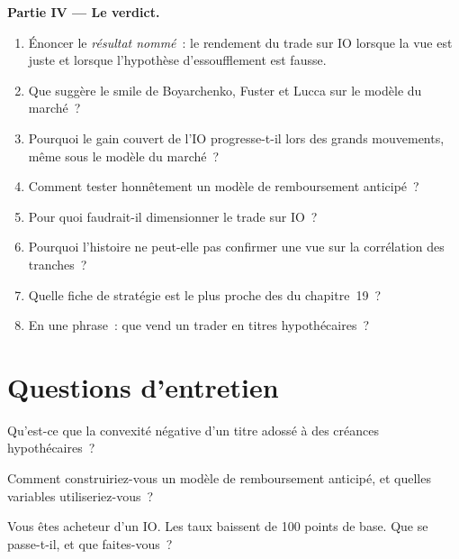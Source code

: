\begin{problem}
\medskip\noindent\textbf{Partie IV --- Le verdict.}
\begin{enumerate}[resume]
\item Énoncer le \emph{résultat nommé}~: le rendement du trade sur IO lorsque la vue est juste et lorsque l'hypothèse d'essoufflement est fausse.
\item Que suggère le smile de Boyarchenko, Fuster et Lucca sur le modèle du marché~?
\item Pourquoi le gain couvert de l'IO progresse-t-il lors des grands mouvements, même sous le modèle du marché~?
\item Comment tester honnêtement un modèle de remboursement anticipé~?
\item Pour quoi faudrait-il dimensionner le trade sur IO~?
\item Pourquoi l'histoire ne peut-elle pas confirmer une vue sur la corrélation des tranches~?
\item Quelle fiche de stratégie est le plus proche des  du chapitre~19~?
\item En une phrase~: que vend un trader en titres hypothécaires~?
\end{enumerate}
\end{problem}

\section{Questions d'entretien}

\begin{interviewq}\label{iq:s2:mortgage-and-structured-credit-strategies:1}
Qu'est-ce que la convexité négative d'un titre adossé à des créances hypothécaires~?
\end{interviewq}

\begin{interviewq}\label{iq:s2:mortgage-and-structured-credit-strategies:2}
Comment construiriez-vous un modèle de remboursement anticipé, et quelles variables utiliseriez-vous~?
\end{interviewq}

\begin{interviewq}\label{iq:s2:mortgage-and-structured-credit-strategies:3}
Vous êtes acheteur d'un IO. Les taux baissent de 100 points de base. Que se passe-t-il, et que faites-vous~?
\end{interviewq}

